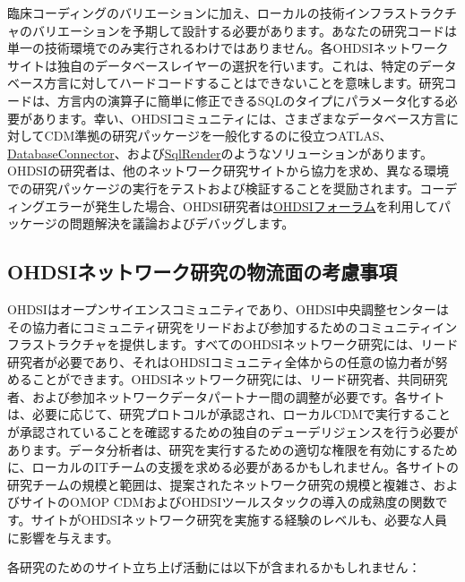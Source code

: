 \documentclass[
  11pt]{book}
\theoremstyle{definition}
\theoremstyle{definition}
\theoremstyle{definition}
\theoremstyle{definition}
\theoremstyle{remark}
\begin{document}
臨床コーディングのバリエーションに加え、ローカルの技術インフラストラクチャのバリエーションを予期して設計する必要があります。あなたの研究コードは単一の技術環境でのみ実行されるわけではありません。各OHDSIネットワークサイトは独自のデータベースレイヤーの選択を行います。これは、特定のデータベース方言に対してハードコードすることはできないことを意味します。研究コードは、方言内の演算子に簡単に修正できるSQLのタイプにパラメータ化する必要があります。幸い、OHDSIコミュニティには、さまざまなデータベース方言に対してCDM準拠の研究パッケージを一般化するのに役立つATLAS、\href{https://ohdsi.github.io/DatabaseConnector/}{DatabaseConnector}、および\href{https://ohdsi.github.io/SqlRender/}{SqlRender}のようなソリューションがあります。OHDSIの研究者は、他のネットワーク研究サイトから協力を求め、異なる環境での研究パッケージの実行をテストおよび検証することを奨励されます。コーディングエラーが発生した場合、OHDSI研究者は\href{http://forums.ohdsi.org}{OHDSIフォーラム}を利用してパッケージの問題解決を議論およびデバッグします。

\subsection{OHDSIネットワーク研究の物流面の考慮事項}\label{ohdsiux30cdux30c3ux30c8ux30efux30fcux30afux7814ux7a76ux306eux7269ux6d41ux9762ux306eux8003ux616eux4e8bux9805}


OHDSIはオープンサイエンスコミュニティであり、OHDSI中央調整センターはその協力者にコミュニティ研究をリードおよび参加するためのコミュニティインフラストラクチャを提供します。すべてのOHDSIネットワーク研究には、リード研究者が必要であり、それはOHDSIコミュニティ全体からの任意の協力者が努めることができます。OHDSIネットワーク研究には、リード研究者、共同研究者、および参加ネットワークデータパートナー間の調整が必要です。各サイトは、必要に応じて、研究プロトコルが承認され、ローカルCDMで実行することが承認されていることを確認するための独自のデューデリジェンスを行う必要があります。データ分析者は、研究を実行するための適切な権限を有効にするために、ローカルのITチームの支援を求める必要があるかもしれません。各サイトの研究チームの規模と範囲は、提案されたネットワーク研究の規模と複雑さ、およびサイトのOMOP CDMおよびOHDSIツールスタックの導入の成熟度の関数です。サイトがOHDSIネットワーク研究を実施する経験のレベルも、必要な人員に影響を与えます。

各研究のためのサイト立ち上げ活動には以下が含まれるかもしれません：
\end{document}
